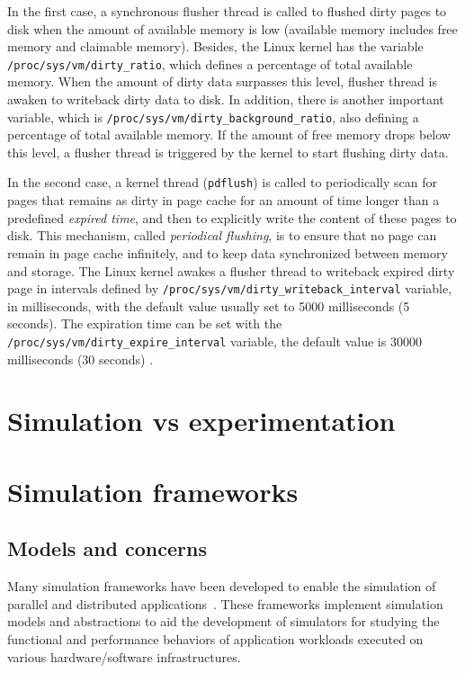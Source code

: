 In the first case, a synchronous flusher thread is called to flushed dirty pages 
to disk when the amount of available memory is low (available memory 
includes free memory and claimable memory).
Besides, the Linux kernel has the variable \texttt{/proc/sys/vm/dirty\_ratio}, 
which defines a percentage of total available memory. 
When the amount of dirty data surpasses this level, flusher thread is awaken 
to writeback dirty data to disk.
In addition, there is another important variable, 
which is \texttt{/proc/sys/vm/dirty\_background\_ratio},
also defining a percentage of total available memory. 
If the amount of free memory drops below this level, a flusher thread is 
triggered by the kernel to start flushing dirty data.

In the second case, a kernel thread (\texttt{pdflush}) is called to periodically 
scan for pages that remains as dirty in page cache for an amount of time 
longer than a predefined \textit{expired time}, and then to explicitly write 
the content of these pages to disk. 
This mechanism, called \textit{periodical flushing}, is to ensure that no page 
can remain in page cache infinitely, and to keep data synchronized between 
memory and storage.
The Linux kernel awakes a flusher thread to writeback expired dirty page in 
intervals defined by \texttt{/proc/sys/vm/dirty\_writeback\_interval} variable, 
in milliseconds, with the default value usually set to 5000 milliseconds (5 seconds). 
The expiration time can be set with the 
\texttt{/proc/sys/vm/dirty\_expire\_interval} variable, 
the default value is 30000 milliseconds (30 seconds) \cite{linuxdev3rd2010}.

\section{Simulation vs experimentation}



\section{Simulation frameworks}

\subsection{Models and concerns}

Many simulation frameworks have been developed to enable the
simulation of parallel and distributed
applications~\cite{optorsim, gridsim, groudsim, cloudsim,
nunez2012simcan,nunez2012icancloud, mdcsim, dissect_cf,
cloudnetsimplusplus, fognetsimplusplus, casanova2014simgrid,
ROSS, casanova2020fgcs}. These frameworks implement simulation
models and abstractions to aid the development of simulators
for studying the functional and performance behaviors of
application workloads executed on various hardware/software
infrastructures. 

